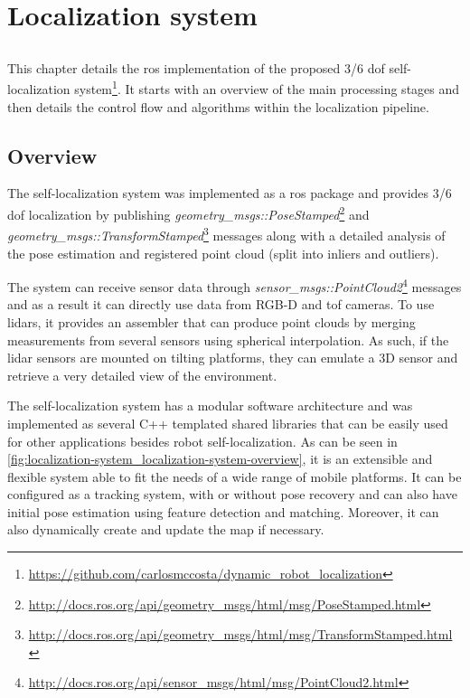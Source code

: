 \chapter{Localization system} \label{chap:localization-system}



\section*{}

This chapter details the \gls{ros} implementation of the proposed 3/6 \gls{dof} self-localization system\footnote{\url{https://github.com/carlosmccosta/dynamic_robot_localization}}. It starts with an overview of the main processing stages and then details the control flow and algorithms within the localization pipeline.



\section{Overview}

The self-localization system was implemented as a \gls{ros} package and provides 3/6 \gls{dof} localization by publishing \emph{geometry\_msgs::PoseStamped}\footnote{\url{http://docs.ros.org/api/geometry_msgs/html/msg/PoseStamped.html}} and \emph{geometry\_msgs::TransformStamped}\footnote{\url{http://docs.ros.org/api/geometry_msgs/html/msg/TransformStamped.html}} messages along with a detailed analysis of the pose estimation and registered point cloud (split into inliers and outliers).

The system can receive sensor data through \emph{sensor\_msgs::PointCloud2}\footnote{\url{http://docs.ros.org/api/sensor_msgs/html/msg/PointCloud2.html}} messages and as a result it can directly use data from RGB-D and \gls{tof} cameras. To use \glspl{lidar}, it provides an assembler that can produce point clouds by merging measurements from several sensors using spherical interpolation. As such, if the \gls{lidar} sensors are mounted on tilting platforms, they can emulate a 3D sensor and retrieve a very detailed view of the environment.

The self-localization system has a modular software architecture and was implemented as several C++ templated shared libraries that can be easily used for other applications besides robot self-localization. As can be seen in \cref{fig:localization-system_localization-system-overview}, it is an extensible and flexible system able to fit the needs of a wide range of mobile platforms. It can be configured as a tracking system, with or without pose recovery and can also have initial pose estimation using feature detection and matching. Moreover, it can also dynamically create and update the map if necessary.

